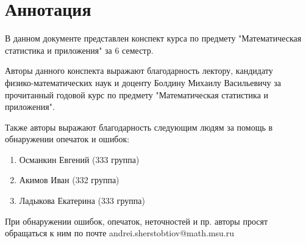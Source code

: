 \section{Аннотация}

В данном документе представлен конспект курса по
предмету "Математическая статистика и приложения"
за 6 семестр.

Авторы данного конспекта выражают благодарность лектору, кандидату \\ физико-математических наук и доценту
Болдину Михаилу Васильевичу за прочитанный годовой курс по предмету
"Математическая статистика и приложения".

Также авторы выражают благодарность следующим людям за помощь
в обнаружении опечаток и ошибок:
\begin{enumerate}
    \item Османкин Евгений (333 группа)
    \item Акимов Иван (332 группа)
    \item Ладыкова Екатерина (333 группа)
\end{enumerate}

При обнаружении ошибок, опечаток, неточностей и пр. авторы просят
обращаться к ним по почте andrei.sherstobtiov@math.msu.ru